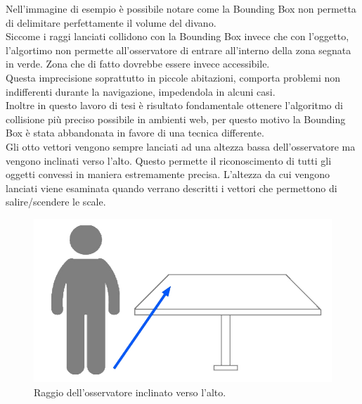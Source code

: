 Nell’immagine di esempio è possibile notare come la Bounding Box non permetta di delimitare perfettamente il volume del divano.
\\
Siccome i raggi lanciati collidono con la Bounding Box invece che con l’oggetto, l’algortimo non permette all’osservatore di entrare all’interno della zona segnata in verde. Zona che di fatto dovrebbe essere invece accessibile.
\\
Questa imprecisione soprattutto in piccole abitazioni, comporta problemi non indifferenti durante la navigazione, impedendola in alcuni casi.
\\
Inoltre in questo lavoro di tesi è risultato fondamentale ottenere l’algoritmo di collisione più preciso possibile in ambienti web, per questo motivo la Bounding Box è stata abbandonata in favore di una tecnica differente.
\\
Gli otto vettori vengono sempre lanciati ad una altezza bassa dell’osservatore ma vengono inclinati verso l’alto. Questo permette il riconoscimento di tutti gli oggetti convessi in maniera estremamente precisa. L’altezza da cui vengono lanciati viene esaminata quando verrano descritti i vettori che permettono di salire/scendere le scale.

\begin{figure}[htb]
 \centering
 \includegraphics[width=1\linewidth]{images/chapter_navigazione_scena/collision_tav3.jpg}\hfill
 \caption[Raggi inclinati verso l'alto.]{Raggio dell'osservatore inclinato verso l'alto.}
 \label{fig:navigazione_scena_collision_tav3}
\end{figure}

